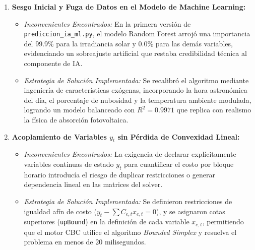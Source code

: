 \documentclass[11pt,a4paper]{article}
\begin{document}
\begin{enumerate}
    \item \textbf{Sesgo Inicial y Fuga de Datos en el Modelo de Machine Learning:}
    \begin{itemize}
        \item \textit{Inconvenientes Encontrados:} En la primera versión de \texttt{prediccion\_ia\_ml.py}, el modelo Random Forest arrojó una importancia del 99.9\% para la irradiancia solar y 0.0\% para las demás variables, evidenciando un sobreajuste artificial que restaba credibilidad técnica al componente de IA.
        \item \textit{Estrategia de Solución Implementada:} Se recalibró el algoritmo mediante ingeniería de características exógenas, incorporando la hora astronómica del día, el porcentaje de nubosidad y la temperatura ambiente modulada, logrando un modelo balanceado con $R^2 = 0.9971$ que replica con realismo la física de absorción fotovoltaica.
    \end{itemize}

    \item \textbf{Acoplamiento de Variables $y_t$ sin Pérdida de Convexidad Lineal:}
    \begin{itemize}
        \item \textit{Inconvenientes Encontrados:} La exigencia de declarar explícitamente variables continuas de estado $y_t$ para cuantificar el costo por bloque horario introducía el riesgo de duplicar restricciones o generar dependencia lineal en las matrices del solver.
        \item \textit{Estrategia de Solución Implementada:} Se definieron restricciones de igualdad afín de costo ($y_t - \sum C_{e,t} x_{e,t} = 0$), y se asignaron cotas superiores (\texttt{upBound}) en la definición de cada variable $x_{e,t}$, permitiendo que el motor CBC utilice el algoritmo \textit{Bounded Simplex} y resuelva el problema en menos de 20 milisegundos.
    \end{itemize}
\end{enumerate}

\end{document}
